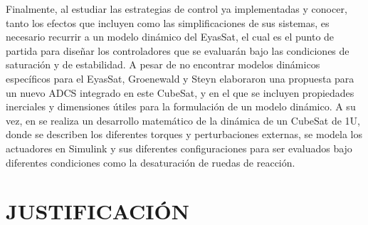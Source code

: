 Finalmente, al estudiar las estrategias de control ya implementadas y conocer, tanto los efectos que incluyen como las simplificaciones de sus sistemas, es necesario recurrir a un modelo dinámico del EyasSat, el cual es el punto de partida para diseñar los controladores que se evaluarán bajo las condiciones de saturación y de estabilidad. A pesar de no encontrar modelos dinámicos específicos para el EyasSat, Groenewald y Steyn \cite{Groenewald2014} elaboraron una propuesta para un nuevo ADCS integrado en este CubeSat, y en el que se incluyen propiedades inerciales y dimensiones útiles para la formulación de un modelo dinámico.
A su vez, en \cite{tes:Sorolla2019} se realiza un desarrollo matemático de la dinámica de un CubeSat de 1U, donde se describen los diferentes torques y perturbaciones externas, se modela los actuadores en Simulink y sus diferentes configuraciones para ser evaluados bajo diferentes condiciones como la desaturación de ruedas de reacción.


\newpage


\section{JUSTIFICACIÓN}

 
%
%
%

